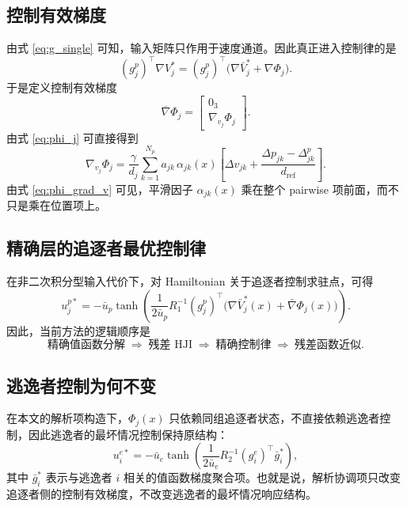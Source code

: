 \documentclass[11pt,a4paper]{article}
\newcommand{\ubar}{\bar{u}}
\begin{document}
\subsection{控制有效梯度}

由式 \eqref{eq:g_single} 可知，输入矩阵只作用于速度通道。因此真正进入控制律的是
\begin{equation}
(g_j^p)^\top \nabla V_j^*
=(g_j^p)^\top\big(\nabla\bar V_j^*+\nabla\Phi_j\big).
\end{equation}
于是定义控制有效梯度
\begin{equation}
\bar\nabla\Phi_j=
\begin{bmatrix}
0_3\\
\nabla_{v_j}\Phi_j
\end{bmatrix}.
\end{equation}
由式 \eqref{eq:phi_j} 可直接得到
\begin{equation}
\nabla_{v_j}\Phi_j
=
\frac{\gamma}{d_j}
\sum_{k=1}^{N_p}
a_{jk}\,\alpha_{jk}(x)
\left[
\Delta v_{jk}
+
\frac{\Delta p_{jk}-\Delta_{jk}^{p}}{d_{\mathrm{ref}}}
\right].
\label{eq:phi_grad_v}
\end{equation}
由式 \eqref{eq:phi_grad_v} 可见，平滑因子 $\alpha_{jk}(x)$ 乘在整个 pairwise 项前面，而不只是乘在位置项上。

\subsection{精确层的追逐者最优控制律}

在非二次积分型输入代价下，对 Hamiltonian 关于追逐者控制求驻点，可得
\begin{equation}
u_j^{p*}
=
-\ubar_p
\tanh\!\left(
\frac{1}{2\ubar_p}
R_1^{-1}
(g_j^p)^\top
\big(
\nabla\bar V_j^*(x)+\bar\nabla\Phi_j(x)
\big)
\right).
\label{eq:pursuer_ctrl_exact}
\end{equation}
因此，当前方法的逻辑顺序是
\[
\text{精确值函数分解}
\;\Longrightarrow\;
\text{残差 HJI}
\;\Longrightarrow\;
\text{精确控制律}
\;\Longrightarrow\;
\text{残差函数近似}.
\]

\subsection{逃逸者控制为何不变}

在本文的解析项构造下，$\Phi_j(x)$ 只依赖同组追逐者状态，不直接依赖逃逸者控制，因此逃逸者的最坏情况控制保持原结构：
\begin{equation}
u_i^{e*}
=
-\ubar_e
\tanh\!\left(
\frac{1}{2\ubar_e}
R_2^{-1}(g_i^e)^\top \bar g_i^*
\right),
\end{equation}
其中 $\bar g_i^*$ 表示与逃逸者 $i$ 相关的值函数梯度聚合项。也就是说，解析协调项只改变追逐者侧的控制有效梯度，不改变逃逸者的最坏情况响应结构。
\end{document}
